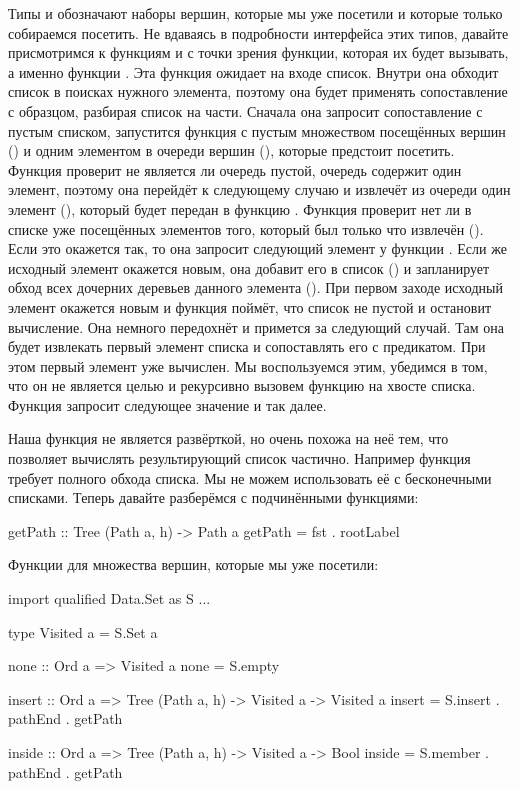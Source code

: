 Типы  и  обозначают наборы вершин, которые мы
уже посетили и которые только собираемся посетить. Не вдаваясь в
подробности интерфейса этих типов, давайте присмотримся к функциям
 и  с точки зрения функции, которая их будет вызывать,
а именно функции . Эта функция ожидает на входе список.
Внутри она обходит список в поисках нужного элемента, поэтому она будет
применять сопоставление с образцом, разбирая список на части. Сначала
она запросит сопоставление с пустым списком, запустится функция
 с пустым множеством посещённых вершин () и одним
элементом в очереди вершин (), которые предстоит
посетить. Функция  проверит не является ли очередь пустой,
очередь содержит один элемент, поэтому она перейдёт к следующему случаю
и извлечёт из очереди один элемент (), который будет передан в
функцию . Функция  проверит нет ли в списке уже
посещённых элементов того, который был только что извлечён
(). Если это окажется так, то она запросит
следующий элемент у функции . Если же исходный элемент окажется
новым, она добавит его в список () и запланирует
обход всех дочерних деревьев данного элемента
(). При первом заходе исходный
элемент окажется новым и функция  поймёт, что список не
пустой и остановит вычисление. Она немного передохнёт и примется за
следующий случай. Там она будет извлекать первый элемент списка и
сопоставлять его с предикатом. При этом первый элемент уже вычислен. Мы
воспользуемся этим, убедимся в том, что он не является целью и
рекурсивно вызовем функцию  на хвосте списка. Функция
 запросит следующее значение и так далее.

Наша функция  не является развёрткой, но очень похожа на
неё тем, что позволяет вычислять результирующий список частично.
Например функция  требует полного обхода списка. Мы не можем
использовать её с бесконечными списками. Теперь давайте разберёмся с
подчинёнными функциями:


\begin{code}
getPath :: Tree (Path a, h) -> Path a
getPath = fst . rootLabel
\end{code}

Функции для множества вершин, которые мы уже посетили:


\begin{code}
import qualified Data.Set as S
...

type Visited a   = S.Set a

none :: Ord a => Visited a
none = S.empty

insert :: Ord a => Tree (Path a, h) -> Visited a -> Visited a
insert = S.insert . pathEnd . getPath

inside :: Ord a => Tree (Path a, h) -> Visited a -> Bool
inside = S.member . pathEnd . getPath
\end{code}

